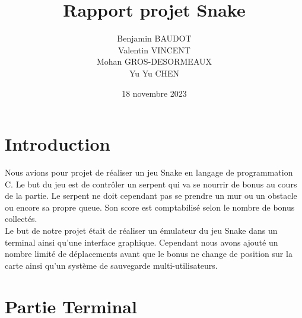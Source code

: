 \documentclass{article}
\title{Rapport projet Snake}
\author{
Benjamin BAUDOT\\[0.1cm]
Valentin VINCENT\\[0.1cm]
Mohan GROS-DESORMEAUX\\[0.1cm]
Yu Yu CHEN\\[0.1cm]}
\date{18 novembre 2023}
\begin{document}
\maketitle
\tableofcontents
\section{Introduction}
Nous avions pour projet de réaliser un jeu Snake en langage de programmation C. Le but du jeu est de contrôler un serpent qui va se nourrir de bonus au cours de la partie. Le serpent ne doit cependant pas se prendre un mur ou un obstacle ou encore sa propre queue. Son score est comptabilisé selon le nombre de bonus collectés.\\[0.5 cm]
Le but de notre projet était de réaliser un émulateur du jeu Snake dans un terminal ainsi qu’une interface graphique. Cependant nous avons ajouté un nombre limité de déplacements avant que le bonus ne change de position sur la carte ainsi qu’un système de sauvegarde multi-utilisateurs.\\[0.5 cm]
\section{Partie Terminal}
\end{document}
